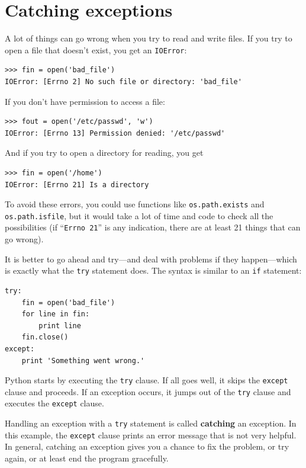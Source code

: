 \documentclass[10pt]{book}
\begin{document}
\section{Catching exceptions}
\label{catch}

A lot of things can go wrong when you try to read and write
files.  If you try to open a file that doesn't exist, you get an
{\tt IOError}:

\begin{verbatim}
>>> fin = open('bad_file')
IOError: [Errno 2] No such file or directory: 'bad_file'
\end{verbatim}
%
If you don't have permission to access a file:

\begin{verbatim}
>>> fout = open('/etc/passwd', 'w')
IOError: [Errno 13] Permission denied: '/etc/passwd'
\end{verbatim}
%
And if you try to open a directory for reading, you get

\begin{verbatim}
>>> fin = open('/home')
IOError: [Errno 21] Is a directory
\end{verbatim}
%
To avoid these errors, you could use functions like {\tt os.path.exists}
and {\tt os.path.isfile}, but it would take a lot of time and code
to check all the possibilities (if ``{\tt Errno 21}'' is any
indication, there are at least 21 things that can go wrong).

It is better to go ahead and try---and deal with problems if they
happen---which is exactly what the {\tt try} statement does.  The
syntax is similar to an {\tt if} statement:

\begin{verbatim}
try:
    fin = open('bad_file')
    for line in fin:
        print line
    fin.close()
except:
    print 'Something went wrong.'
\end{verbatim}
%
Python starts by executing the {\tt try} clause.  If all goes
well, it skips the {\tt except} clause and proceeds.  If an
exception occurs, it jumps out of the {\tt try} clause and
executes the {\tt except} clause.

Handling an exception with a {\tt try} statement is called {\bf
catching} an exception.  In this example, the {\tt except} clause
prints an error message that is not very helpful.  In general,
catching an exception gives you a chance to fix the problem, or try
again, or at least end the program gracefully.
\end{document}
